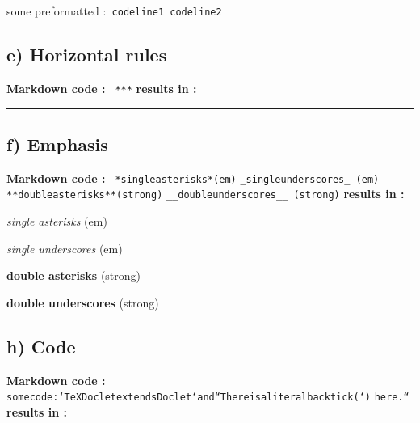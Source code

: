 \documentclass[11pt,a4paper]{report}
\begin{document}
{some preformatted :\texttt{\small
\mbox{}\newline \texttt{\small code\phantom{ }line\phantom{ }1\phantom{ }}\mbox{}\newline
\texttt{\small code\phantom{ }line\phantom{ }2}}
\subsection*{e) Horizontal rules}{\bf Markdown code :}\texttt{\small
\mbox{}\newline \phantom{ }}\mbox{}\newline
\texttt{\small \phantom{ }***}\mbox{}\newline
\texttt{\small \phantom{ }}\mbox{}\newline
\texttt{\small \phantom{ }}
{\bf results in :}\mbox{}\newline\rule[2mm]{\hsize}{0.5mm}\newline
\subsection*{f) Emphasis}{\bf Markdown code :}\texttt{\small
\mbox{}\newline \phantom{ }}\mbox{}\newline
\texttt{\small \phantom{ }*single\phantom{ }asterisks*\phantom{ }(em)}\mbox{}\newline
\texttt{\small \phantom{ }}\mbox{}\newline
\texttt{\small \phantom{ }\_single\phantom{ }underscores\_\ (em)}\mbox{}\newline
\texttt{\small \phantom{ }}\mbox{}\newline
\texttt{\small \phantom{ }**double\phantom{ }asterisks**\phantom{ }(strong)}\mbox{}\newline
\texttt{\small \phantom{ }}\mbox{}\newline
\texttt{\small \phantom{ }\_\_double\phantom{ }underscores\_\_\ (strong)}\mbox{}\newline
\texttt{\small \phantom{ }}\mbox{}\newline
\texttt{\small \phantom{ }}
{\bf results in :}

\textit{ single asterisks} (em)

\textit{ single underscores} (em)

{\bf double asterisks} (strong)

{\bf double underscores} (strong)\subsection*{h) Code}{\bf Markdown code :}\texttt{\small
\mbox{}\newline \phantom{ }}\mbox{}\newline
\texttt{\small \phantom{ }some\phantom{ }code\phantom{ }:\phantom{ }`TeXDoclet\phantom{ }extends\phantom{ }Doclet`\phantom{ }and\phantom{ }``There\phantom{ }is\phantom{ }a\phantom{ }literal\phantom{ }backtick\phantom{ }(`)}\mbox{}\newline
\texttt{\small \phantom{ }here.``}\mbox{}\newline
\texttt{\small \phantom{ }}\mbox{}\newline
\texttt{\small \phantom{ }}
{\bf results in :}

}
\end{document}
